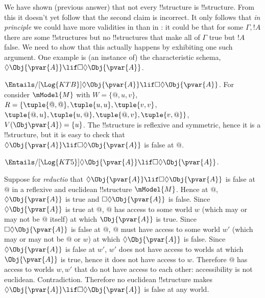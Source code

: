 \documentclass[../../../../include/open-logic-section]{subfiles}
\begin{document}
\begin{prob}
\begin{ans}
\begin{enumerate}
		We have shown (previous answer) that not every  
		!!{structure} is  !!{structure}. From this it doesn't
		yet follow that the second claim is incorrect. It only  
		follows that \emph{in principle} we could have more validities 
		in  than in : it could be that for some 
		$\Gamma,!A$ there are some  !!{structure}s but no 
		!!{structure}s that make all of $\Gamma$ true but $!A$ false. 
		We need to show that this actually happens by exhibiting one 
		such argument. One example is (an instance of) 
		the characteristic  schema, 
		$\Diamond\Obj{\pvar{A}}\lif\Box\Diamond\Obj{\pvar{A}}$.

		$\Entails/[\Log{KTB}] \Diamond\Obj{\pvar{A}}\lif
		\Box\Diamond\Obj{\pvar{A}}$. For consider $\mModel{M}$ 
		with $W=\{@,u,v\}$,
        $R=\{\tuple{@,@},\tuple{u,u},\tuple{v,v}$,
        $\tuple{@,u},\tuple{u,@},\tuple{@,v},\tuple{v,@}
        \}$, $V(\Obj\pvar{A})=\{u\}$. The !!{structure} is reflexive
		and symmetric, hence it is a  !!{structure}, 
		but it is easy to check that 
		$\Diamond\Obj{\pvar{A}}\lif\Box\Diamond\Obj{\pvar{A}}$
		is false at $@$.

		$\Entails/[\Log{KT5}] \Diamond\Obj{\pvar{A}}\lif
		\Box\Diamond\Obj{\pvar{A}}$. 

		Suppose for \emph{reductio} that $\Diamond\Obj{\pvar{A}}\lif
		\Box\Diamond\Obj{\pvar{A}}$ is false at $@$ in a reflexive and
		euclidean !!{structure} $\mModel{M}$. Hence at $@$,
		$\Diamond\Obj{\pvar{A}}$ is true and
		$\Box\Diamond\Obj{\pvar{A}}$ is false. Since
		$\Diamond\Obj{\pvar{A}}$ is true at $@$, $@$ has access to
		some world $w$ (which may or may not be $@$ itself) at which
		$\Obj{\pvar{A}}$ is true. Since $\Box\Diamond\Obj{\pvar{A}}$
		is false at $@$, $@$ must have access to some world $w'$
		(which may or may not be $@$ or $w$) at which
		$\Diamond\Obj{\pvar{A}}$ is false. Since
		$\Diamond\Obj{\pvar{A}}$ is false at $w'$, $w'$ does not have
		access to worlds at which $\Obj{\pvar{A}}$ is true, hence it
		does not have access to $w$. Therefore $@$ has access to
		worlds $w,w'$ that do not have access to each other:
		accessibility is not euclidean. Contradiction. Therefore no
		euclidean !!{structure} makes $\Diamond\Obj{\pvar{A}}\lif
		\Box\Diamond\Obj{\pvar{A}}$ is false at any world.


	\end{enumerate}
	
	\end{ans}

\end{prob}
\end{document}
